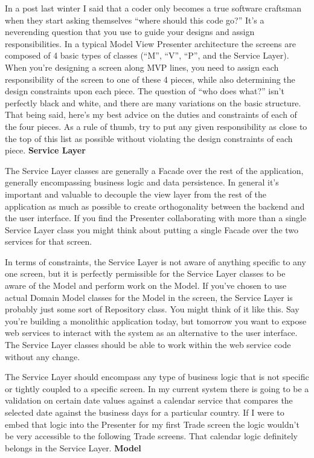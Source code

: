 \documentclass{article}
\begin{document}
{In a post last winter I said that a coder only becomes a true software craftsman when they start asking themselves “where should this code go?”  It's a neverending question that you use to guide your designs and assign responsibilities.  In a typical Model View Presenter architecture the screens are composed of 4 basic types of classes (“M”, “V”, “P”, and the Service Layer).  When you're designing a screen along MVP lines, you need to assign each responsibility of the screen to one of these 4 pieces, while also determining the design constraints upon each piece.  The question of “who does what?” isn't perfectly black and white, and there are many variations on the basic structure.  That being said, here's my best advice on the duties and constraints of each of the four pieces.  As a rule of thumb, try to put any given responsibility as close to the top of this list as possible without violating the design constraints of each piece.
\Large {\textbf{Service Layer}}

The Service Layer classes are generally a Facade over the rest of the application, generally encompassing business logic and data persistence.  In general it's important and valuable to decouple the view layer from the rest of the application as much as possible to create orthogonality between the backend and the user interface.  If you find the Presenter collaborating with more than a single Service Layer class you might think about putting a single Facade over the two services for that screen. 

In terms of constraints, the Service Layer is not aware of anything specific to any one screen, but it is perfectly permissible for the Service Layer classes to be aware of the Model and perform work on the Model.  If you've chosen to use actual Domain Model classes for the Model in the screen, the Service Layer is probably just some sort of Repository class.  You might think of it like this.  Say you're building a monolithic application today, but tomorrow you want to expose web services to interact with the system as an alternative to the user interface.  The Service Layer classes should be able to work within the web service code without any change.

The Service Layer should encompass any type of business logic that is not specific or tightly coupled to a specific screen.  In my current system there is going to be a validation on certain date values against a calendar service that compares the selected date against the business days for a particular country.  If I were to embed that logic into the Presenter for my first Trade screen the logic wouldn't be very accessible to the following Trade screens.  That calendar logic definitely belongs in the Service Layer. 
\Large {\textbf{Model }}

}
\end{document}
